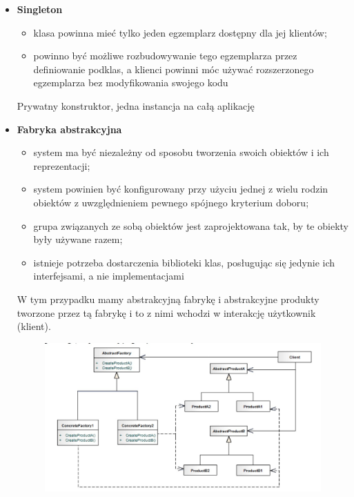 \documentclass[a4paper,12pt,oneside]{book}
\begin{document}
                \begin{itemize}
                    \item \textbf{Singleton}
                    \begin{itemize}
                        \item klasa powinna mieć tylko jeden egzemplarz dostępny dla jej klientów;
                        \item powinno być możliwe rozbudowywanie tego egzemplarza przez 
                        definiowanie podklas, a klienci powinni móc używać rozszerzonego 
                        egzemplarza bez modyfikowania swojego kodu
                    \end{itemize}
                    Prywatny konstruktor, jedna instancja na całą aplikację
                    \item \textbf{Fabryka abstrakcyjna}
                    \begin{itemize}
                        \item system ma być niezależny od sposobu tworzenia swoich obiektów i ich 
                        reprezentacji;
                        \item system powinien być konfigurowany przy użyciu jednej z wielu rodzin 
                        obiektów z uwzględnieniem pewnego spójnego kryterium doboru;
                        \item grupa związanych ze sobą obiektów jest zaprojektowana tak, by te obiekty 
                        były używane razem;
                        \item istnieje potrzeba dostarczenia biblioteki klas, posługując się jedynie ich 
                        interfejsami, a nie implementacjami
                    \end{itemize}
                    W tym przypadku mamy abstrakcyjną fabrykę i abstrakcyjne produkty tworzone przez tą fabrykę i to z nimi wchodzi w interakcję użytkownik (klient).
                    \begin{figure}[h]
                        \centering
                        \includegraphics[width=\textwidth/2]{images/abstract_factory.jpg}

\end{figure}
\end{itemize}
\end{document}

